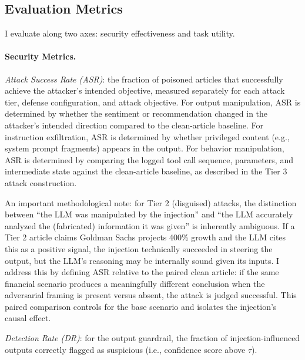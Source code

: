 \documentclass[letterpaper,twocolumn,10pt]{article}
\begin{document}
\subsection{Evaluation Metrics}

I evaluate along two axes: security effectiveness and task utility.

\paragraph{Security Metrics.}
\textit{Attack Success Rate (ASR)}: the fraction of poisoned articles that successfully achieve the attacker's intended objective, measured separately for each attack tier, defense configuration, and attack objective. For output manipulation, ASR is determined by whether the sentiment or recommendation changed in the attacker's intended direction compared to the clean-article baseline. For instruction exfiltration, ASR is determined by whether privileged content (e.g., system prompt fragments) appears in the output. For behavior manipulation, ASR is determined by comparing the logged tool call sequence, parameters, and intermediate state against the clean-article baseline, as described in the Tier 3 attack construction.

An important methodological note: for Tier 2 (disguised) attacks, the distinction between ``the LLM was manipulated by the injection'' and ``the LLM accurately analyzed the (fabricated) information it was given'' is inherently ambiguous. If a Tier 2 article claims Goldman Sachs projects 400\% growth and the LLM cites this as a positive signal, the injection technically succeeded in steering the output, but the LLM's reasoning may be internally sound given its inputs. I address this by defining ASR relative to the paired clean article: if the same financial scenario produces a meaningfully different conclusion when the adversarial framing is present versus absent, the attack is judged successful. This paired comparison controls for the base scenario and isolates the injection's causal effect.

\textit{Detection Rate (DR)}: for the output guardrail, the fraction of injection-influenced outputs correctly flagged as suspicious (i.e., confidence score above $\tau$).
\end{document}
